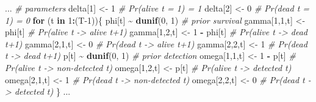 \documentclass[
  12pt,
]{krantz}
\newenvironment{Shaded}{\begin{snugshade}}{\end{snugshade}}
\newcommand{\CommentTok}[1]{\textcolor[rgb]{0.56,0.35,0.01}{\textit{#1}}}
\newcommand{\ControlFlowTok}[1]{\textcolor[rgb]{0.13,0.29,0.53}{\textbf{#1}}}
\newcommand{\DecValTok}[1]{\textcolor[rgb]{0.00,0.00,0.81}{#1}}
\newcommand{\FunctionTok}[1]{\textcolor[rgb]{0.13,0.29,0.53}{\textbf{#1}}}
\newcommand{\NormalTok}[1]{#1}
\newcommand{\OtherTok}[1]{\textcolor[rgb]{0.56,0.35,0.01}{#1}}
\newcommand{\SpecialCharTok}[1]{\textcolor[rgb]{0.81,0.36,0.00}{\textbf{#1}}}
\begin{document}
\begin{Shaded}
\begin{Highlighting}[]
\NormalTok{...}
\CommentTok{\# parameters}
\NormalTok{  delta[}\DecValTok{1}\NormalTok{] }\OtherTok{\textless{}{-}} \DecValTok{1}          \CommentTok{\# Pr(alive t = 1) = 1}
\NormalTok{  delta[}\DecValTok{2}\NormalTok{] }\OtherTok{\textless{}{-}} \DecValTok{0}          \CommentTok{\# Pr(dead t = 1) = 0}
  \ControlFlowTok{for}\NormalTok{ (t }\ControlFlowTok{in} \DecValTok{1}\SpecialCharTok{:}\NormalTok{(T}\DecValTok{{-}1}\NormalTok{))\{}
\NormalTok{    phi[t] }\SpecialCharTok{\textasciitilde{}} \FunctionTok{dunif}\NormalTok{(}\DecValTok{0}\NormalTok{, }\DecValTok{1}\NormalTok{) }\CommentTok{\# prior survival}
\NormalTok{    gamma[}\DecValTok{1}\NormalTok{,}\DecValTok{1}\NormalTok{,t] }\OtherTok{\textless{}{-}}\NormalTok{ phi[t]      }\CommentTok{\# Pr(alive t {-}\textgreater{} alive t+1)}
\NormalTok{    gamma[}\DecValTok{1}\NormalTok{,}\DecValTok{2}\NormalTok{,t] }\OtherTok{\textless{}{-}} \DecValTok{1} \SpecialCharTok{{-}}\NormalTok{ phi[t]  }\CommentTok{\# Pr(alive t {-}\textgreater{} dead t+1)}
\NormalTok{    gamma[}\DecValTok{2}\NormalTok{,}\DecValTok{1}\NormalTok{,t] }\OtherTok{\textless{}{-}} \DecValTok{0}        \CommentTok{\# Pr(dead t {-}\textgreater{} alive t+1)}
\NormalTok{    gamma[}\DecValTok{2}\NormalTok{,}\DecValTok{2}\NormalTok{,t] }\OtherTok{\textless{}{-}} \DecValTok{1}        \CommentTok{\# Pr(dead t {-}\textgreater{} dead t+1)}
\NormalTok{    p[t] }\SpecialCharTok{\textasciitilde{}} \FunctionTok{dunif}\NormalTok{(}\DecValTok{0}\NormalTok{, }\DecValTok{1}\NormalTok{) }\CommentTok{\# prior detection}
\NormalTok{    omega[}\DecValTok{1}\NormalTok{,}\DecValTok{1}\NormalTok{,t] }\OtherTok{\textless{}{-}} \DecValTok{1} \SpecialCharTok{{-}}\NormalTok{ p[t]    }\CommentTok{\# Pr(alive t {-}\textgreater{} non{-}detected t)}
\NormalTok{    omega[}\DecValTok{1}\NormalTok{,}\DecValTok{2}\NormalTok{,t] }\OtherTok{\textless{}{-}}\NormalTok{ p[t]        }\CommentTok{\# Pr(alive t {-}\textgreater{} detected t)}
\NormalTok{    omega[}\DecValTok{2}\NormalTok{,}\DecValTok{1}\NormalTok{,t] }\OtherTok{\textless{}{-}} \DecValTok{1}        \CommentTok{\# Pr(dead t {-}\textgreater{} non{-}detected t)}
\NormalTok{    omega[}\DecValTok{2}\NormalTok{,}\DecValTok{2}\NormalTok{,t] }\OtherTok{\textless{}{-}} \DecValTok{0}        \CommentTok{\# Pr(dead t {-}\textgreater{} detected t)}
\NormalTok{  \}}
\NormalTok{...}
\end{Highlighting}
\end{Shaded}
\end{document}
